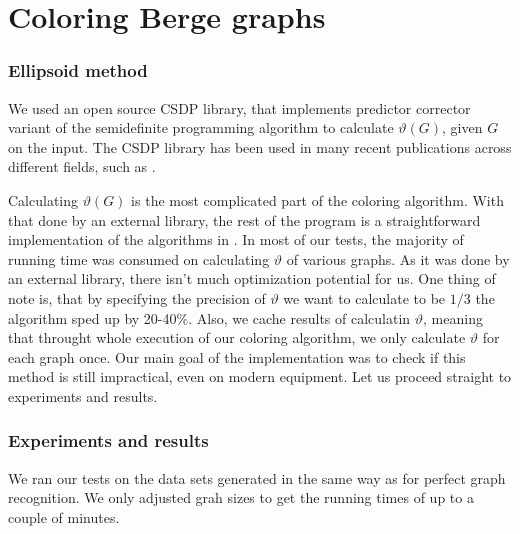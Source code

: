 
\section{Coloring Berge graphs}

\subsubsection{Ellipsoid method}

We used an open source CSDP \cite{csdpRepo, csdp1999} library, that implements predictor corrector variant of the semidefinite programming algorithm to calculate $\vartheta(G)$, given $G$ on the input. The CSDP library has been used in many recent publications across different fields, such as \cite{Ampountolas_2017, Adasme_2011}.

Calculating $\vartheta(G)$ is the most complicated part of the coloring algorithm. With that done by an external library, the rest of the program is a straightforward implementation of the algorithms in . In most of our tests, the majority of running time was consumed on calculating $\vartheta$ of various graphs. As it was done by an external library, there isn't much optimization potential for us. One thing of note is, that by specifying the precision of $\vartheta$ we want to calculate to be $1/3$ the algorithm sped up  by 20-40\%. Also, we cache results of calculatin $\vartheta$, meaning that throught whole execution of our coloring algorithm, we only calculate $\vartheta$ for each graph once. Our main goal of the implementation was to check if this method is still impractical, even on modern equipment. Let us proceed straight to experiments and results.

\subsubsection{Experiments and results}

We ran our tests on the data sets generated in the same way as for perfect graph recognition. We only adjusted grah sizes to get the running times of up to a couple of minutes. 


